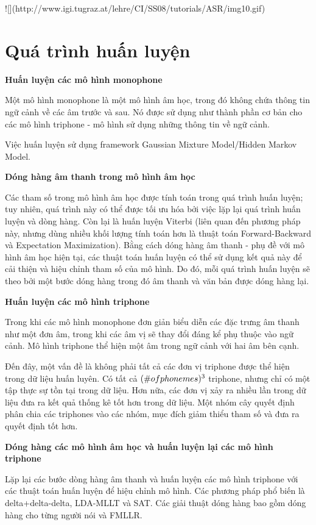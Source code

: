 ![](http://www.igi.tugraz.at/lehre/CI/SS08/tutorials/ASR/img10.gif)

\section{Quá trình huấn luyện}

\textbf{Huấn luyện các mô hình monophone}

Một mô hình monophone là một mô hình âm học, trong đó không chứa thông tin ngữ cảnh về các âm trước và sau. Nó được sử dụng như thành phần cơ bản cho các mô hình triphone - mô hình sử dụng những thông tin về ngữ cảnh.

Việc huấn luyện sử dụng framework Gaussian Mixture Model/Hidden Markov Model.

\textbf{Dóng hàng âm thanh trong mô hình âm học}

Các tham số trong mô hình âm học được tính toán trong quá trình huấn luyện; tuy nhiên, quá trình này có thể được tối ưu hóa bởi việc lặp lại quá trình huấn luyện và dòng hàng. Còn lại là huấn luyện Viterbi (liên quan đến phương pháp này, nhưng dùng nhiều khối lượng tính toán hơn là thuật toán Forward-Backward và Expectation Maximization). Bằng cách dóng hàng âm thanh - phụ đề với mô hình âm học hiện tại, các thuật toán huấn luyện có thể sử dụng kết quả này để cải thiện và hiệu chỉnh tham số của mô hình. Do đó, mỗi quá trình huấn luyện sẽ theo bởi một bước dóng hàng trong đó âm thanh và văn bản được dóng hàng lại.

\textbf{Huấn luyện các mô hình triphone}

Trong khi các mô hình monophone đơn giản biểu diễn các đặc trưng âm thanh như một đơn âm, trong khi các âm vị sẽ thay đổi đáng kể phụ thuộc vào ngữ cảnh. Mô hình triphone thể hiện một âm trong ngữ cảnh với hai âm bên cạnh.

Đến đây, một vấn đề là không phải tất cả các đơn vị triphone được thể hiện trong dữ liệu huấn luyên. Có tất cả $\textnormal(\# of phonemes)^3$ triphone, nhưng chỉ có một tập thực sự tồn tại trong dữ liệu. Hơn nữa, các đơn vị xảy ra nhiều lần trong dữ liệu đưa ra kết quả thống kê tốt hơn trong dữ liệu. Một nhóm cây quyết định phân chia các triphones vào các nhóm, mục đích giảm thiểu tham số và đưa ra quyết định tốt hơn.

\textbf{Dóng hàng các mô hình âm học và huấn luyện lại các mô hình triphone}

Lặp lại các bước dòng hàng âm thanh và huấn luyện các mô hình triphone với các thuật toán huấn luyện để hiệu chỉnh mô hình. Các phương pháp phổ biến là delta+delta-delta, LDA-MLLT và SAT. Các giải thuật dóng hàng bao gồm dóng hàng cho từng người nói và FMLLR.

